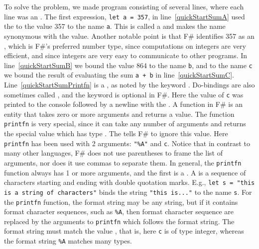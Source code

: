 To solve the problem, we made program consisting of several lines, where each line was an . The first expression, \lstinline|let a = 357|, in line~\ref{quickStartSumA} used the   to  the value 357 to the name \lstinline|a|. This is called a  and makes the name synonymous with the value. Another notable point is that F\# identifies 357 as an , which is F\#'s preferred number type, since computations on integers are very efficient, and since integers are very easy to communicate to other programs. In line~\ref{quickStartSumB} we bound the value 864 to the name \lstinline|b|, and to the name \lstinline|c| we bound the result of evaluating the sum \lstinline|a + b| in line~\ref{quickStartSumC}. Line~\ref{quickStartSumPrintfn} is a , as noted by the keyword . Do-bindings are also sometimes called , and the  keyword is optional in F\#. Here the value of \lstinline|c| was printed to the console followed by a newline
with the  . A function in F\# is an entity that takes zero or more arguments and returns a value. The function \lstinline|printfn| is very special, since it can take any number of arguments and returns the special value \idx[{()}@\lstinline{()}]{\lexeme{()}} which has type . The  tells F\# to ignore this value. Here \lstinline{printfn} has been used with 2 arguments: \lstinline|"%A"| %
and \lstinline|c|. Notice that in contrast to many other languages, F\# does not use parentheses to frame the list of arguments, nor does it use commas to separate them. In general, the \lstinline|printfn| function always has 1 or more arguments, and the first is a . A  is a sequence of characters starting and ending with double quotation marks. E.g., \lstinline|let s = "this is a string of characters"| binds the string \lstinline|"this is..."| to the name \lstinline|s|. For the \lstinline|printfn| function, the format string may be any string, but if it contains format character sequences, such as \lstinline|%A|,
 then format character sequence are replaced by the arguments to \lstinline{printfn} which follows the format string. The format string must match the value , that is, here \lstinline|c| is of type integer, whereas the format string \lstinline|%A| %
matches many types.

